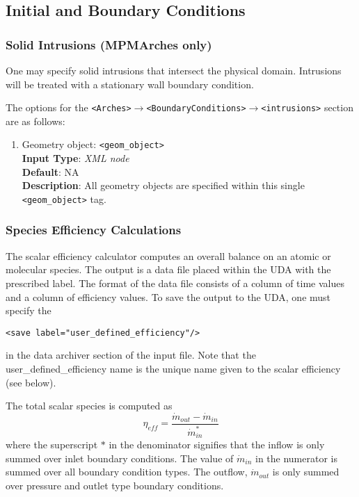 \subsection{Initial and Boundary Conditions} 
% 
\subsubsection{Solid Intrusions (MPMArches only)}
One may specify solid intrusions that intersect the physical domain.  Intrusions will be treated with a stationary wall boundary condition.  

The options for the \verb=<Arches>=$\rightarrow$\verb=<BoundaryConditions>=$\rightarrow$\verb=<intrusions>= section are as follows:
%
\begin{enumerate}
\item Geometry object: \verb=<geom_object>= \\
{\bf Input Type}: {\it XML node} \\
{\bf Default}: NA \\
{\bf Description}: All geometry objects are specified within this single \verb=<geom_object>= tag.  
\end{enumerate}
 
%
\subsubsection{Species Efficiency Calculations}
%
The scalar efficiency calculator computes an overall balance on an atomic or molecular species.  The output is a data file placed within the UDA with the prescribed label.  The format of the data file consists of a column of time values and a column of efficiency values.  To save the output to the UDA, one must specify the
\begin{Verbatim}
<save label="user_defined_efficiency"/> 
\end{Verbatim}
in the data archiver section of the input file.  Note that the user\_defined\_efficiency name is the unique name given to the scalar efficiency (see below). 

The total scalar species is computed as
%
\begin{equation}
\eta_{eff} = \frac{\dot{m}_{out}-\dot{m}_{in}}{\dot{m}_{in}^*}
\end{equation}    
%
where the superscript $*$ in the denominator signifies that the inflow is only summed over inlet boundary conditions.  The value of $\dot{m}_{in}$ in the numerator is summed over all boundary condition types.  The outflow, $\dot{m}_{out}$ is only summed over pressure and outlet type boundary conditions.

